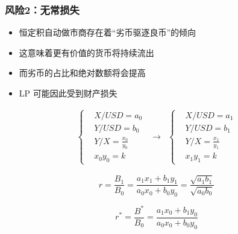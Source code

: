 \documentclass{beamer}
\begin{document}
\begin{frame}
    \frametitle{风险2：无常损失}

    \begin{itemize}
        \item 恒定积自动做市商存在着“劣币驱逐良币”的倾向
        \item 这意味着更有价值的货币将持续流出
        \item 而劣币的占比和绝对数额将会提高
        \item LP 可能因此受到财产损失
    \end{itemize}

    \begin{equation}
        \begin{matrix}
            \left\{ 
                \begin{aligned}
                    & X/USD = a_0 \\
                    & Y/USD = b_0 \\
                    & Y/X = \frac{x_0}{y_0}\\
                    & x_0y_0 = k
                \end{aligned}
            \right.
            & \rightarrow &
            \left\{ 
                \begin{aligned}
                    & X/USD = a_1 \\
                    & Y/USD = b_1 \\
                    & Y/X = \frac{x_1}{y_1}\\
                    & x_1y_1 = k
                \end{aligned}
            \right.
        \end{matrix}
    \end{equation}

    \begin{equation}
    r = \frac{B_1}{B_0} 
    = \frac{a_1x_1+b_1y_1}{a_0x_0+b_0y_0} 
    = \frac{\sqrt{a_1b_1}}{\sqrt{a_0b_0}}
    \end{equation}

    \begin{equation}
        r^* = \frac{B^*}{B_0} = \frac{a_1x_0+b_1y_0}{a_0x_0+b_0y_0}
    \end{equation}
\end{frame}
\end{document}
